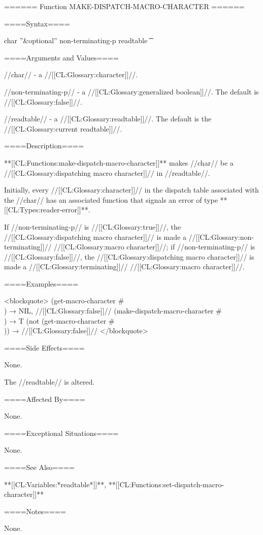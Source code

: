 ====== Function MAKE-DISPATCH-MACRO-CHARACTER ======

====Syntax====

 {char ''&optional'' non-terminating-p readtable} {\t}

====Arguments and Values====

//char// - a //[[CL:Glossary:character]]//.

//non-terminating-p// - a //[[CL:Glossary:generalized boolean]]//. The default is //[[CL:Glossary:false]]//.

//readtable// - a //[[CL:Glossary:readtable]]//. The default is the //[[CL:Glossary:current readtable]]//.

====Description====

**[[CL:Functions:make-dispatch-macro-character]]** makes //char// be a //[[CL:Glossary:dispatching macro character]]// in //readtable//.

Initially, every //[[CL:Glossary:character]]// in the dispatch table associated with the //char// has an associated function that signals an error of type **[[CL:Types:reader-error]]**.

If //non-terminating-p// is //[[CL:Glossary:true]]//, the //[[CL:Glossary:dispatching macro character]]// is made a //[[CL:Glossary:non-terminating]]// //[[CL:Glossary:macro character]]//; if //non-terminating-p// is //[[CL:Glossary:false]]//, the //[[CL:Glossary:dispatching macro character]]// is made a //[[CL:Glossary:terminating]]// //[[CL:Glossary:macro character]]//.

====Examples====

<blockquote> (get-macro-character #\\\lbr) → NIL, //[[CL:Glossary:false]]// (make-dispatch-macro-character #\\\lbr) → T (not (get-macro-character #\\\lbr)) → //[[CL:Glossary:false]]// </blockquote>

====Side Effects====

None.


The //readtable// is altered.

====Affected By====

None.

====Exceptional Situations====

None.

====See Also====

**[[CL:Variables:*readtable*]]**, **[[CL:Functions:set-dispatch-macro-character]]**

====Notes====

None.

